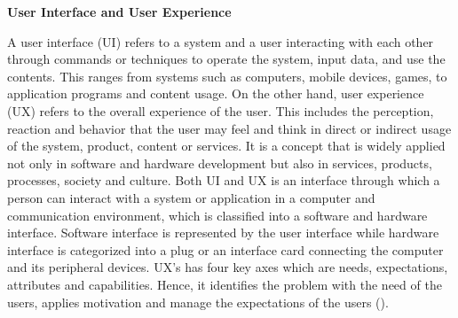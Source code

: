 \flushleft
\textbf{User Interface and User Experience}\\
\justifying

\parx
A user interface (UI) refers to a system and a user interacting with each other through
commands or techniques to operate the system, input data, and use the contents. This
ranges from systems such as computers, mobile devices, games, to application programs
and content usage. On the other hand, user experience (UX) refers to the overall
experience of the user. This includes the perception, reaction and behavior that the
user may feel and think in direct or indirect usage of the system, product, content or
services. It is a concept that is widely applied not only in software and hardware
development but also in services, products, processes, society and culture. Both UI and
UX is an interface through which a person can interact with a system or application in
a computer and communication environment, which is classified into a software and
hardware interface. Software interface is represented by the user interface while
hardware interface is categorized into a plug or an interface card connecting the
computer and its peripheral devices. UX’s has four key axes which are needs,
expectations, attributes and capabilities. Hence, it identifies the problem with the
need of the users, applies motivation and manage the expectations of the users
(\cite{joo_2017}).
